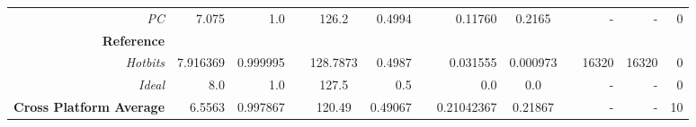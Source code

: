 \documentclass{IEEEtran}
\begin{document}
\begin{table}[h!]
\begin{adjustwidth}{-1.25 cm}{}
\begin{tabular}{@{}rrrrcrrrcrrrr@{}}
\textit{PC}& 7.075 & 1.0 && 126.2 &0.4994 && 0.11760 & 0.2165 && - & - & 0\\
\textbf{Reference}\\
\textit{Hotbits} & 7.916369 & 0.999995  && 128.7873 & 0.4987 && 0.031555 & 0.000973 && 16320 & 16320 & 0\\
\textit{Ideal}& 8.0& 1.0&& 127.5& 0.5&& 0.0& 0.0 && - & - & 0\\
\bottomrule
\textbf{Cross Platform Average}& 6.5563 & 0.997867 && 120.49 & 0.49067 && 0.21042367 &0.21867 && - & - & 10\\
\bottomrule
\end{tabular}
\end{adjustwidth}
\end{table}



\newpage
\onecolumn
\end{document}
